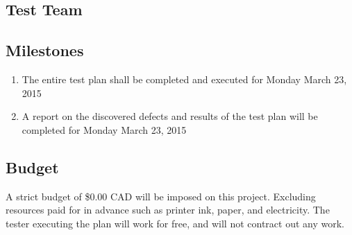 \documentclass[]{article}
\begin{document}

\subsection{Test Team}
\label{sub:product_functions}


\subsection{Milestones}
\label{sub:user_characteristics}
\begin{enumerate}[1)]
	\item The entire test plan shall be completed and executed for Monday March 23,
	2015
	\item A report on the discovered defects and results of the test plan will be
	completed for Monday March 23, 2015
\end{enumerate}

\subsection{Budget}
\label{sub:constraints}
A strict budget of \$0.00 CAD will be imposed on this project.  Excluding
resources paid for in advance such as printer ink, paper, and electricity.  The
tester executing the plan will work for free, and will not contract out any
work.


% 
% 
\end{document}
